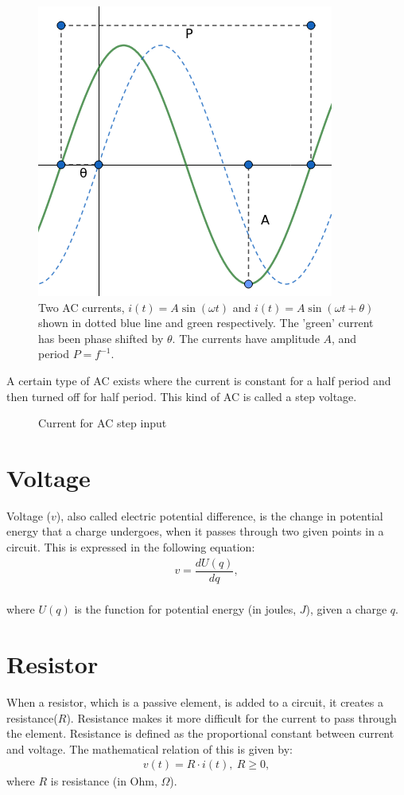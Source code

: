 \begin{figure}[H]
	\centering
	\includegraphics[scale=0.7]{fig/img/AC.png}
	\caption{Two AC currents, $i(t)=A\sin(\omega t)$ and $i(t)=A\sin(\omega t+\theta)$ shown in dotted blue line and green respectively. The 'green' current has been phase shifted by $\theta$. The currents have amplitude $A$, and period $P=f^{-1}$.}
\end{figure}
\noindent A certain type of AC exists where the current is constant for a half period and then turned off for half period. This kind of AC is called a step voltage.
\begin{figure}[H] 

\caption{Current for AC step input}
\end{figure}
\section{Voltage}
Voltage ($v$), also called electric potential difference, is the change in potential energy that a charge undergoes, when it passes through two given points in a circuit. This is expressed in the following equation:
\begin{align*}
	v=\dfrac{dU(q)}{dq},
\end{align*}
\\
where $U(q)$ is the function for potential energy (in joules, $J$), given a charge $q$.
\section{Resistor}
When a resistor, which is a passive element, is added to a circuit, it creates a resistance($R$). Resistance makes it more difficult for the current to pass through the element. Resistance is defined as the proportional constant between current and voltage. The mathematical relation of this is given by: \cite[p.~22]{bcircuit5}
\begin{align} 
\label{Ohm}
v(t)=R\cdot i(t),\ R\geq0,
\end{align}
where $R$ is resistance (in Ohm, $\Omega$).
